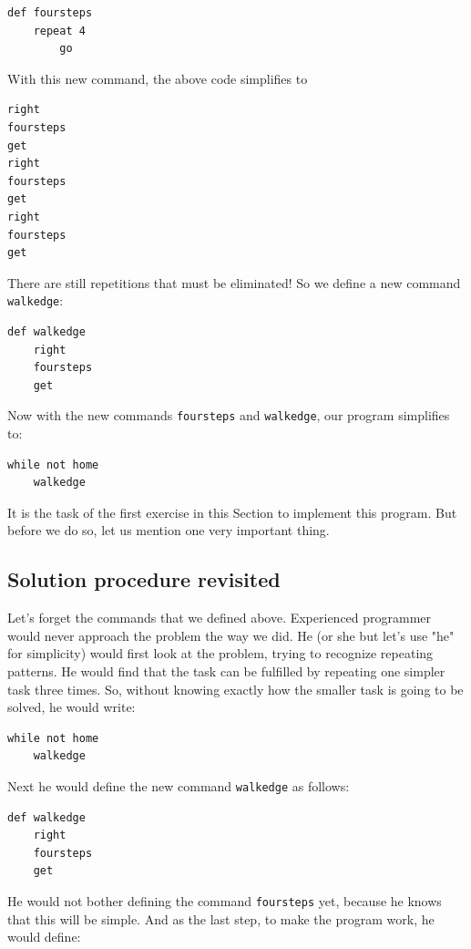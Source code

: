 {\small
\begin{verbatim}
def foursteps
    repeat 4
        go
\end{verbatim}
}
\noindent
With this new command, the above code simplifies to 

{\small
\begin{verbatim}
right
foursteps
get
right
foursteps
get
right
foursteps
get
\end{verbatim}
}
\noindent
There are still repetitions that must be eliminated! So we define a new command 
{\tt walkedge}:

{\small
\begin{verbatim}
def walkedge
    right
    foursteps
    get
\end{verbatim}
}
\noindent
Now with the new commands {\tt foursteps} and
{\tt walkedge}, our program simplifies to:

{\small
\begin{verbatim}
while not home
    walkedge
\end{verbatim}
}
\noindent
It is the task of the first exercise in this Section to implement this program. But before we 
do so, let us mention one very important thing.

\subsection{Solution procedure revisited}

Let's forget the commands that we defined above.
Experienced programmer would never approach the problem the way we did.
He (or she but let's use "he" for simplicity) 
would first look at the problem, trying to recognize repeating patterns. 
He would find that the task can be fulfilled by repeating one simpler task 
three times. So, without knowing exactly how the smaller task is going to 
be solved, he would write:

{\small
\begin{verbatim}
while not home
    walkedge
\end{verbatim}
}
\noindent
Next he would define the new command {\tt walkedge} as follows:

{\small
\begin{verbatim}
def walkedge
    right
    foursteps
    get
\end{verbatim}
}
\noindent
He would not bother defining the command 
{\tt foursteps} yet, because he knows that this will be 
simple. And as the last step, to make the program work, he would 
define:

